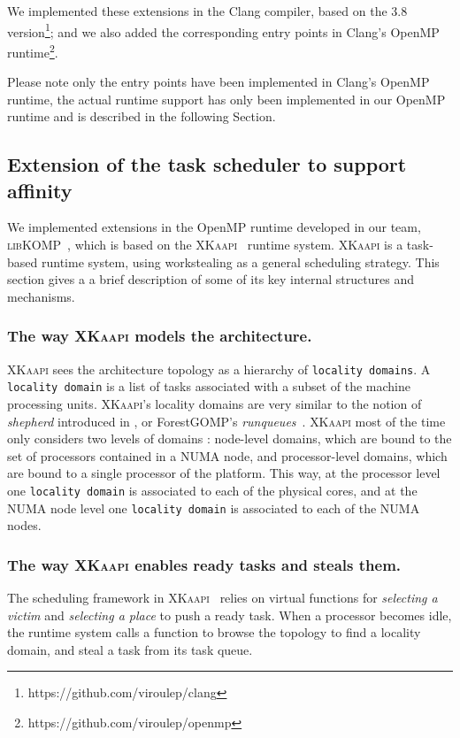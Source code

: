 \documentclass{Styles/llncs}
\newcommand{\kaapi}{\textsc{\mbox{XKaapi}}\xspace}
\newcommand{\libXKOMP}{\textsc{libKOMP}\xspace}
\begin{document}
We implemented these extensions in the Clang compiler, based on the 3.8 version\footnote{https://github.com/viroulep/clang}; and we also added the corresponding entry points in Clang's OpenMP runtime\footnote{https://github.com/viroulep/openmp}.

Please note only the entry points have been implemented in Clang's OpenMP runtime, the actual runtime support has only been implemented in our OpenMP runtime and is described in the following Section.


\subsection{Extension of the task scheduler to support affinity}

We implemented extensions in the OpenMP runtime developed in our team, \libXKOMP~\cite{Durand2013,libkomp},
which is based on the \kaapi~\cite{Bleuse2014,parco2015} runtime system.
\kaapi is a task-based runtime system, using workstealing as a general scheduling strategy.
This section gives a a brief description of some of its key internal structures and mechanisms.

\subsubsection{The way \kaapi models the architecture.}
\kaapi sees the architecture topology as a hierarchy of \verb/locality domains/.
A \verb/locality domain/ is a list of tasks associated with a subset of the machine processing units.
\kaapi's locality domains are very similar to the notion of \emph{shepherd} introduced in \cite{DBLP:journals/ijhpca/OlivierPWSP12}, or ForestGOMP's \emph{runqueues}~\cite{BroFurGogWacNam10IJPP}.
\kaapi most of the time only considers two levels of domains : node-level domains,
which are bound to the set of processors contained in a NUMA node, and processor-level domains, which are bound to a single processor of the platform.
This way, at the processor level one \verb/locality domain/ is associated to each of the physical cores, and
at the NUMA node level one \verb/locality domain/ is associated to each of the NUMA nodes.


\subsubsection{The way \kaapi enables ready tasks and steals them.}

The scheduling framework in \kaapi~\cite{Bleuse2014,parco2015} relies on virtual functions
for \textit{selecting a victim} and \textit{selecting a place} to push a ready task.
When a processor becomes idle, the runtime system calls a function to browse the topology to find a locality domain, and steal a task from its task queue.
\end{document}
